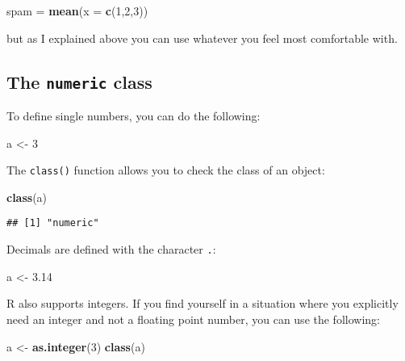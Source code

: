 \documentclass[
]{article}
\newenvironment{Shaded}{\begin{snugshade}}{\end{snugshade}}
\newcommand{\DataTypeTok}[1]{\textcolor[rgb]{0.13,0.29,0.53}{#1}}
\newcommand{\DecValTok}[1]{\textcolor[rgb]{0.00,0.00,0.81}{#1}}
\newcommand{\FloatTok}[1]{\textcolor[rgb]{0.00,0.00,0.81}{#1}}
\newcommand{\KeywordTok}[1]{\textcolor[rgb]{0.13,0.29,0.53}{\textbf{#1}}}
\newcommand{\NormalTok}[1]{#1}
\newcommand{\StringTok}[1]{\textcolor[rgb]{0.31,0.60,0.02}{#1}}
\begin{document}
\begin{Shaded}
\begin{Highlighting}[]
\NormalTok{spam =}\StringTok{ }\KeywordTok{mean}\NormalTok{(}\DataTypeTok{x =} \KeywordTok{c}\NormalTok{(}\DecValTok{1}\NormalTok{,}\DecValTok{2}\NormalTok{,}\DecValTok{3}\NormalTok{))}
\end{Highlighting}
\end{Shaded}

but as I explained above you can use whatever you feel most comfortable with.

\hypertarget{the-numeric-class}{%
\subsection{\texorpdfstring{The \texttt{numeric} class}{The numeric class}}\label{the-numeric-class}}

To define single numbers, you can do the following:

\begin{Shaded}
\begin{Highlighting}[]
\NormalTok{a \textless{}{-}}\StringTok{ }\DecValTok{3}
\end{Highlighting}
\end{Shaded}

The \texttt{class()} function allows you to check the class of an object:

\begin{Shaded}
\begin{Highlighting}[]
\KeywordTok{class}\NormalTok{(a)}
\end{Highlighting}
\end{Shaded}

\begin{verbatim}
## [1] "numeric"
\end{verbatim}

Decimals are defined with the character \texttt{.}:

\begin{Shaded}
\begin{Highlighting}[]
\NormalTok{a \textless{}{-}}\StringTok{ }\FloatTok{3.14}
\end{Highlighting}
\end{Shaded}

R also supports integers. If you find yourself in a situation where you explicitly need an integer
and not a floating point number, you can use the following:

\begin{Shaded}
\begin{Highlighting}[]
\NormalTok{a  \textless{}{-}}\StringTok{ }\KeywordTok{as.integer}\NormalTok{(}\DecValTok{3}\NormalTok{)}
\KeywordTok{class}\NormalTok{(a)}
\end{Highlighting}
\end{Shaded}
\end{document}
